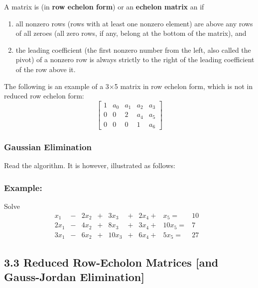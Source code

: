 \documentclass[11pt]{article}
\providecommand{\tightlist}{%
      \setlength{\itemsep}{0pt}\setlength{\parskip}{0pt}}
\begin{document}
A matrix is (in \textbf{row echelon form}) or an \textbf{echelon matrix}
an if

\begin{enumerate}
\def\labelenumi{\arabic{enumi}.}
\tightlist
\item
  all nonzero rows (rows with at least one nonzero element) are above
  any rows of all zeroes (all zero rows, if any, belong at the bottom of
  the matrix), and
\item
  the leading coefficient (the first nonzero number from the left, also
  called the pivot) of a nonzero row is always strictly to the right of
  the leading coefficient of the row above it.
\end{enumerate}

The following is an example of a 3×5 matrix in row echelon form, which
is not in reduced row echelon form: \[
\left[ \begin{array}{ccccc}
1 & a_0 & a_1 & a_2 & a_3 \\
0 & 0 & 2 & a_4 & a_5 \\
0 & 0 & 0 & 1 & a_6
\end{array} \right]
\]

    \hypertarget{gaussian-elimination}{%
\subsubsection{Gaussian Elimination}\label{gaussian-elimination}}

Read the algorithm. It is however, illustrated as follows:

\hypertarget{example}{%
\subsubsection{Example:}\label{example}}

Solve \[
{\begin{alignedat}{12}
x_1&{}-{}&2x_2&{}+{}&3x_3&{}+{}&2x_4{}+{}&x_5{}={}&10&\\
2x_1&{}-{}&4x_2&{}+{}&8x_3&{}+{}&3x_4{}+{}&10x_5{}={}&7&\\
3x_1&{}-{}&6x_2&{}+{}&10x_3&{}+{}&6x_4{}+{}&5x_5{}={}&27&
\end{alignedat}}
\]

    \hypertarget{reduced-row-echolon-matrices-and-gauss-jordan-elimination}{%
\subsection{3.3 Reduced Row-Echolon Matrices {[}and Gauss-Jordan
Elimination{]}}\label{reduced-row-echolon-matrices-and-gauss-jordan-elimination}}
\end{document}
